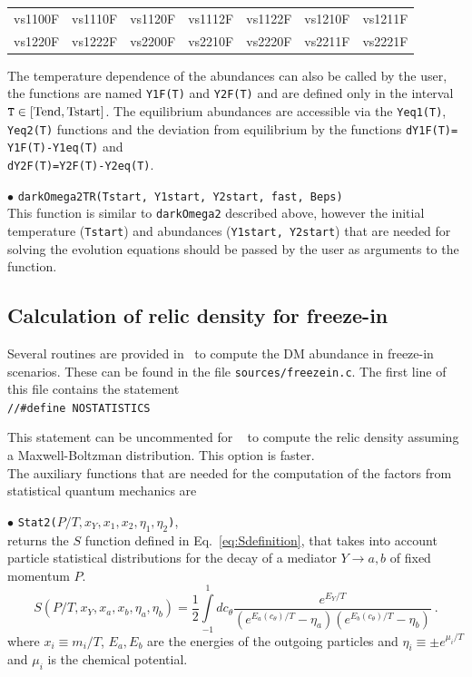 \documentclass[12pt,a4paper]{article}
\begin{document}
\begin{center}
\begin{tabular}{ l l l l l l l }
vs1100F & vs1110F & vs1120F&vs1112F&vs1122F&vs1210F&vs1211F\\
vs1220F&vs1222F&vs2200F&vs2210F&vs2220F&vs2211F& vs2221F
\end{tabular}
\end{center} 

The  temperature dependence  of the abundances can also be called by the user, the functions are named {\tt Y1F(T)} and {\tt Y2F(T)} and are defined only in the  interval ${\tt T}\in
[\rm{Tend},\rm{Tstart}]$. The equilibrium abundances are accessible via  the  { \tt Yeq1(T)}, { \tt Yeq2(T)} functions and the deviation from equilibrium  
by the functions
 {\tt dY1F(T)= Y1F(T)-Y1eq(T)}  and \\
   { \tt dY2F(T)=Y2F(T)-Y2eq(T)}.

\noindent
$\bullet$ \verb|darkOmega2TR(Tstart, Y1start, Y2start, fast, Beps)|\\
This function is similar to \verb|darkOmega2| described above, however the initial temperature (\verb|Tstart|) and abundances (\verb|Y1start, Y2start|) that are needed for solving the evolution equations should be  passed by the user as arguments to the function. 


\subsection{Calculation of relic density for freeze-in}
\label{sec:routines} 

Several routines are provided in \micro~to compute the DM abundance in freeze-in scenarios. These can be found in the file \verb|sources/freezein.c|. The first line of this file contains the statement \\
\verb|//#define NOSTATISTICS|

\noindent
This statement can be uncommented for \micro~ to compute the relic density assuming a Maxwell-Boltzman distribution. This option is faster. 
\\
The auxiliary functions that are needed for the computation of the factors from statistical quantum mechanics are 

\noindent
$\bullet$ \verb|Stat2(|$P/T,x_Y,x_1,x_2,\eta_1,\eta_2$\verb|)|,\\
 returns the $S$ function defined in Eq.~\eqref{eq:Sdefinition}, that takes into account particle statistical distributions for the decay of a mediator $Y \rightarrow a,b$ of fixed momentum $P$. 
\begin{equation}\label{eq:Sdefinition}
S\left( P/T, x_Y, x_a, x_b, \eta_a, \eta_b \right)= \frac{1}{2}\int\limits_{-1}^{1} dc_{\theta}
\frac{e^{E_Y/T}}{(e^{E_a(c_\theta)/T} - \eta_a)(e^{E_b(c_\theta)/T} - \eta_b)}\ .
\end{equation}
where $x_i \equiv m_i/T$, $E_a,E_b$ are the energies of the outgoing particles and $\eta_i \equiv \pm e^{\mu_i/T}$ and $\mu_i$ is the chemical potential.\\
\end{document}

